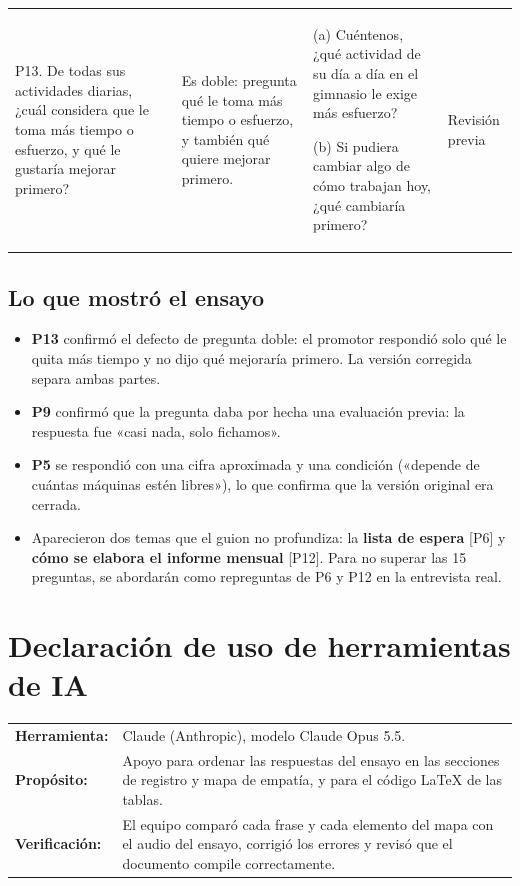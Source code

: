 \documentclass[12pt,a4paper]{article}
\begin{document}
\begin{longtable}{>{\raggedright\arraybackslash}p{4.2cm} >{\raggedright\arraybackslash}p{3.4cm} >{\raggedright\arraybackslash}p{5.2cm} >{\raggedright\arraybackslash}p{1.9cm}}
\rowcolor{lilaS}P13. De todas sus actividades diarias, ¿cuál considera que le toma más tiempo o esfuerzo, y qué le gustaría mejorar primero? & Es doble: pregunta qué le toma más tiempo o esfuerzo, y también qué quiere mejorar primero. & (a) Cuéntenos, ¿qué actividad de su día a día en el gimnasio le exige más esfuerzo?\par\smallskip (b) Si pudiera cambiar algo de cómo trabajan hoy, ¿qué cambiaría primero? & Revisión previa \\
\end{longtable}
\endgroup

\subsection*{Lo que mostró el ensayo}

\begin{itemize}[noitemsep]
  \item \textbf{P13} confirmó el defecto de pregunta doble: el promotor respondió solo qué le quita más tiempo y no dijo qué mejoraría primero. La versión corregida separa ambas partes.
  \item \textbf{P9} confirmó que la pregunta daba por hecha una evaluación previa: la respuesta fue «casi nada, solo fichamos».
  \item \textbf{P5} se respondió con una cifra aproximada y una condición («depende de cuántas máquinas estén libres»), lo que confirma que la versión original era cerrada.
  \item Aparecieron dos temas que el guion no profundiza: la \textbf{lista de espera} [P6] y \textbf{cómo se elabora el informe mensual} [P12]. Para no superar las 15 preguntas, se abordarán como repreguntas de P6 y P12 en la entrevista real.
\end{itemize}

\section{Declaración de uso de herramientas de IA}

\begin{tabularx}{\textwidth}{>{\raggedright\arraybackslash}p{3.0cm} Y}
\textbf{Herramienta:} & Claude (Anthropic), modelo Claude Opus 5.5. \\
\textbf{Propósito:} & Apoyo para ordenar las respuestas del ensayo en las secciones de registro y mapa de empatía, y para el código \LaTeX{} de las tablas. \\
\textbf{Verificación:} & El equipo comparó cada frase y cada elemento del mapa con el audio del ensayo, corrigió los errores y revisó que el documento compile correctamente. \\
\end{tabularx}
\end{document}
